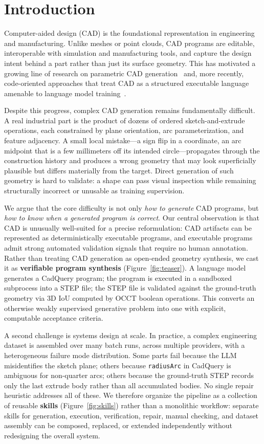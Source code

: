 \section{Introduction}
\label{sec:intro}

Computer-aided design (CAD) is the foundational representation in engineering and manufacturing.
Unlike meshes or point clouds, CAD programs are editable, interoperable with simulation and manufacturing tools, and capture the design intent behind a part rather than just its surface geometry.
This has motivated a growing line of research on parametric CAD generation~\cite{deepcad,skexgen,cadsignet} and, more recently, code-oriented approaches that treat CAD as a structured executable language amenable to language model training~\cite{cadrille,cadrecode}.

Despite this progress, complex CAD generation remains fundamentally difficult.
A real industrial part is the product of dozens of ordered sketch-and-extrude operations, each constrained by plane orientation, arc parameterization, and feature adjacency.
A small local mistake---a sign flip in a coordinate, an arc midpoint that is a few millimeters off its intended circle---propagates through the construction history and produces a wrong geometry that may look superficially plausible but differs materially from the target.
Direct generation of such geometry is hard to validate: a shape can pass visual inspection while remaining structurally incorrect or unusable as training supervision.

We argue that the core difficulty is not only \emph{how to generate} CAD programs, but \emph{how to know when a generated program is correct}.
Our central observation is that CAD is unusually well-suited for a precise reformulation: CAD artifacts can be represented as deterministically executable programs, and executable programs admit strong automated validation signals that require no human annotation.
Rather than treating CAD generation as open-ended geometry synthesis, we cast it as \textbf{verifiable program synthesis} (Figure~\ref{fig:teaser}).
A language model generates a CadQuery program; the program is executed in a sandboxed subprocess into a STEP file; the STEP file is validated against the ground-truth geometry via 3D IoU computed by OCCT boolean operations.
This converts an otherwise weakly supervised generative problem into one with explicit, computable acceptance criteria.

A second challenge is systems design at scale.
In practice, a complex engineering dataset is assembled over many batch runs, across multiple providers, with a heterogeneous failure mode distribution.
Some parts fail because the LLM misidentifies the sketch plane; others because \texttt{radiusArc} in CadQuery is ambiguous for non-quarter arcs; others because the ground-truth STEP records only the last extrude body rather than all accumulated bodies.
No single repair heuristic addresses all of these.
We therefore organize the pipeline as a collection of reusable \textbf{skills} (Figure~\ref{fig:skills}) rather than a monolithic workflow: separate skills for generation, execution, verification, repair, manual checking, and dataset assembly can be composed, replaced, or extended independently without redesigning the overall system.

